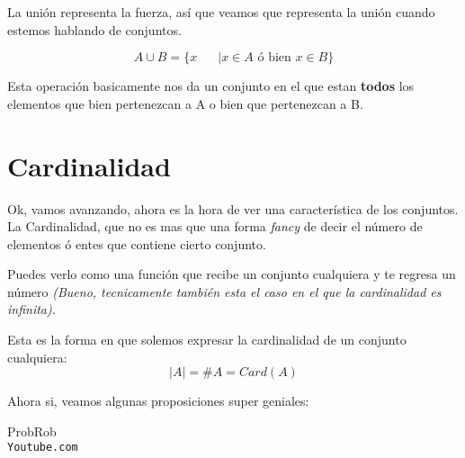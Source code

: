 \documentclass[12pt]{report}                                    %
\DeclareMathOperator \Space {\quad}                             %
\begin{document}
            La unión representa la fuerza, así que veamos que representa la unión cuando estemos
            hablando de conjuntos.

            \begin{equation}
                A \cup B = \{ x \Space | x \in A \text{ ó bien } x \in B \}
            \end{equation}

            Esta operación basicamente nos da un conjunto en el que estan \textbf{todos} los elementos
            que bien pertenezcan a A o bien que pertenezcan a B.




    \clearpage
    \section{Cardinalidad}
            
        Ok, vamos avanzando, ahora es la hora de ver una característica de los conjuntos.
        La Cardinalidad, que no es mas que una forma \emph{fancy} de decir el número de 
        elementos ó entes que contiene cierto conjunto.

        Puedes verlo como una función que
        recibe un conjunto cualquiera y te regresa un número \emph{(Bueno, tecnicamente también
        esta el caso en el que la cardinalidad es infinita)}.

        Esta es la forma en que solemos expresar la cardinalidad de un conjunto cualquiera:
        \begin{equation}   
            |A| = \#A = Card(A)
        \end{equation}


        Ahora si, veamos algunas proposiciones super geniales:






\clearpage

	\begin{thebibliography}{9}

		ProbRob
		\\\texttt{Youtube.com}


	 

\end{thebibliography}
\end{document}
